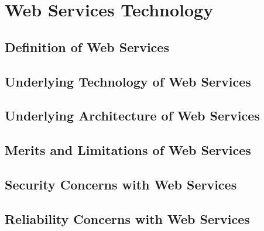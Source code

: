 \chapter{Web Services Technology}

\section{Definition of Web Services}
\section{Underlying Technology of Web Services}
\section{Underlying Architecture of Web Services}
\section{Merits and Limitations of Web Services}
\section{Security Concerns with Web Services}
\section{Reliability Concerns with Web Services}
